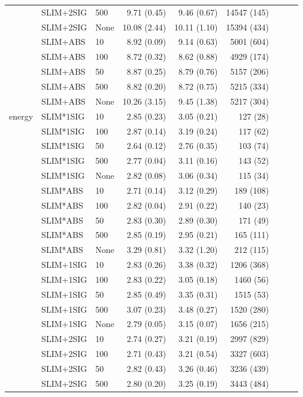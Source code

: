 \begin{longtable}{lllrrrrrr}
 & SLIM+2SIG & 500 & 9.71 (0.45) & 9.46 (0.67) & 14547 (145) \\
 & SLIM+2SIG & None & 10.08 (2.44) & 10.11 (1.10) & 15394 (434) \\
 & SLIM+ABS & 10 & 8.92 (0.09) & 9.14 (0.63) & 5001 (604) \\
 & SLIM+ABS & 100 & 8.72 (0.32) & 8.62 (0.88) & 4929 (174) \\
 & SLIM+ABS & 50 & 8.87 (0.25) & 8.79 (0.76) & 5157 (206) \\
 & SLIM+ABS & 500 & 8.82 (0.20) & 8.72 (0.75) & 5215 (334) \\
 & SLIM+ABS & None & 10.26 (3.15) & 9.45 (1.38) & 5217 (304) \\
\midrule
energy & SLIM*1SIG & 10 & 2.85 (0.23) & 3.05 (0.21) & 127 (28) \\
 & SLIM*1SIG & 100 & 2.87 (0.14) & 3.19 (0.24) & 117 (62) \\
 & SLIM*1SIG & 50 & 2.64 (0.12) & 2.76 (0.35) & 103 (74) \\
 & SLIM*1SIG & 500 & 2.77 (0.04) & 3.11 (0.16) & 143 (52) \\
 & SLIM*1SIG & None & 2.82 (0.08) & 3.06 (0.34) & 115 (34) \\
 & SLIM*ABS & 10 & 2.71 (0.14) & 3.12 (0.29) & 189 (108) \\
 & SLIM*ABS & 100 & 2.82 (0.04) & 2.91 (0.22) & 140 (23) \\
 & SLIM*ABS & 50 & 2.83 (0.30) & 2.89 (0.30) & 171 (49) \\
 & SLIM*ABS & 500 & 2.85 (0.19) & 2.95 (0.21) & 165 (111) \\
 & SLIM*ABS & None & 3.29 (0.81) & 3.32 (1.20) & 212 (115) \\
 & SLIM+1SIG & 10 & 2.83 (0.26) & 3.38 (0.32) & 1206 (368) \\
 & SLIM+1SIG & 100 & 2.83 (0.22) & 3.05 (0.18) & 1460 (56) \\
 & SLIM+1SIG & 50 & 2.85 (0.49) & 3.35 (0.31) & 1515 (53) \\
 & SLIM+1SIG & 500 & 3.07 (0.23) & 3.48 (0.27) & 1520 (280) \\
 & SLIM+1SIG & None & 2.79 (0.05) & 3.15 (0.07) & 1656 (215) \\
 & SLIM+2SIG & 10 & 2.74 (0.27) & 3.21 (0.19) & 2997 (829) \\
 & SLIM+2SIG & 100 & 2.71 (0.43) & 3.21 (0.54) & 3327 (603) \\
 & SLIM+2SIG & 50 & 2.82 (0.43) & 3.26 (0.46) & 3236 (439) \\
 & SLIM+2SIG & 500 & 2.80 (0.20) & 3.25 (0.19) & 3443 (484) \\

\end{longtable}
